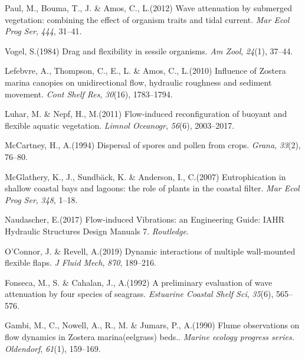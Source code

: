 \documentclass[lineno,authoryear]{FLO_v1}%
\theoremstyle{definition}
\begin{document}
\begin{Backmatter}
\begin{thebibliography}{}
Paul, M., Bouma, T., J. {\&} Amos, C., L.(2012)
Wave attenuation by submerged vegetation: combining the effect of organism traits and tidal current.
	\textit{Mar Ecol Prog Ser}, \textit{444}, 31--41.

Vogel, S.(1984)
Drag and flexibility in sessile organisms.
	\textit{Am Zool}, \textit{24}(1), 37--44.

Lefebvre, A., Thompson, C., E., L. {\&} Amos, C., L.(2010)
Influence of Zostera marina canopies on unidirectional flow, hydraulic roughness and sediment movement.
	\textit{Cont Shelf Res}, \textit{30}(16), 1783--1794.

Luhar, M. {\&} Nepf, H., M.(2011)
Flow-induced reconfiguration of buoyant and flexible aquatic vegetation.
	\textit{Limnol Oceanogr}, \textit{56}(6), 2003--2017.

McCartney, H., A.(1994)
Dispersal of spores and pollen from crops.
	\textit{Grana}, \textit{33}(2), 76--80.

McGlathery, K., J., Sundb{\"a}ck, K. {\&} Anderson, I., C.(2007)
Eutrophication in shallow coastal bays and lagoons: the role of plants in the coastal filter.
	\textit{Mar Ecol Prog Ser}, \textit{348}, 1--18.

Naudascher, E.(2017)
Flow-induced Vibrations: an Engineering Guide: IAHR Hydraulic Structures Design Manuals 7.
	\textit{Routledge}.

O’Connor, J. {\&} Revell, A.(2019)
Dynamic interactions of multiple wall-mounted flexible flaps.
	\textit{J Fluid Mech}, \textit{870}, 189--216.

Fonseca, M., S. {\&} Cahalan, J., A.(1992)
A preliminary evaluation of wave attenuation by four species of seagrass.
	\textit{Estuarine Coastal Shelf Sci}, \textit{35}(6), 565--576.

Gambi, M., C., Nowell, A., R., M. {\&} Jumars, P., A.(1990)
Flume observations on flow dynamics in Zostera marina(eelgrass) beds..
	\textit{Marine ecology progress series. Oldendorf}, \textit{61}(1), 159--169.


\end{thebibliography}
\end{Backmatter}
\end{document}
